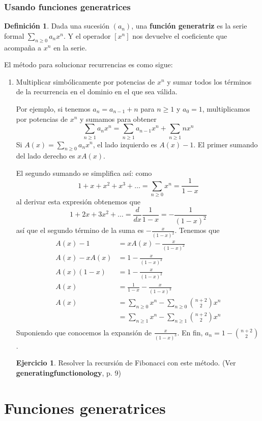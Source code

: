 \documentclass[spanish]{book}
\theoremstyle{definition}
\newtheorem*{defn}{Definición}
\newtheorem*{ejer}{Ejercicio}
\begin{document}
\subsection{Usando funciones generatrices}\label{sec:res-rec-fg}
\begin{defn}
	Dada una sucesión $(a_n)$, una \textbf{función generatriz} es la serie formal $\sum_{n\geq0}a_nx^n$. Y el operador $[x^n]$ nos devuelve el coeficiente que acompaña a $x^n$ en la serie.
\end{defn}
El método para solucionar recurrencias es como sigue:
\begin{enumerate}
	\item Multiplicar simbólicamente por potencias de $x^n$ y sumar todos los términos de la recurrencia en el dominio en el que sea válida.
	
	Por ejemplo, si tenemos $a_n=a_{n-1}+n$ para $n\geq1$ y $a_0=1$, multiplicamos por potencias de $x^n$ y sumamos para obtener
	\[\sum_{n\geq1}a_nx^n=\sum_{n\geq 1}a_{n-1}x^n+\sum_{n\geq1}nx^n\]
	Si $A(x)=\sum_{n\geq0}a_nx^n$, el lado izquierdo es $A(x)-1$. El primer sumando del lado derecho es $xA(x)$.
	
	El segundo sumando se simplifica así: como
	 \[1+x+x^2+x^3+\ldots=\sum_{n\geq0}x^n=\frac{1}{1-x}\]
	al derivar esta expresión obtenemos que
	\[1+2x+3x^2+\ldots=\frac{d}{dx}\frac{1}{1-x}=-\frac{1}{(1-x)^2}\]
	así que el segundo término de la suma es $-\frac{x}{(1-x)^2}$. Tenemos que
	\begin{align*}
		A(x)-1&=xA(x)-\frac{x}{(1-x)^2}\\ A(x)-xA(x)&=1-\frac{x}{(1-x)^2}\\
		A(x)(1-x)&=1-\frac{x}{(1-x)^2}\\
		A(x)&=\frac{1}{1-x}-\frac{x}{(1-x)^3}\\
		A(x)&=\sum_{n\geq0}x^n-\sum_{n\geq0}{n+2\choose 2}x^n\\
		&=\sum_{n\geq1}x^n-\sum_{n\geq1}{n+2\choose 2}x^n\\
	\end{align*}
	Suponiendo que conocemos la expansión de $\frac{x}{(1-x)^3}$. En fin, $a_n=1-{n+2\choose 2}$.
	\begin{ejer}
		Resolver la recursión de Fibonacci con este método. (Ver \textbf{generatingfunctionology}, p. 9)
	\end{ejer}
	
\end{enumerate}
\chapter{Funciones generatrices}
\end{document}
